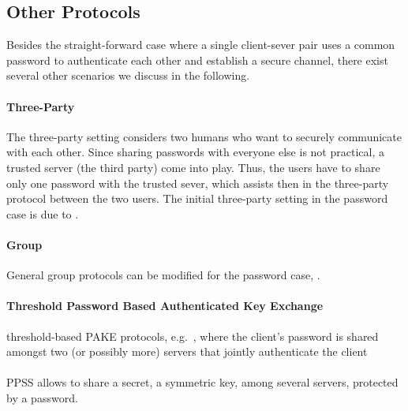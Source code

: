 
\subsection{Other  Protocols}
Besides the straight-forward case where a single client-sever pair uses a common password to authenticate each other and establish a secure channel, there exist several other scenarios we discuss in the following.

\paragraph{Three-Party }
The three-party setting considers two humans who want to securely communicate with each other.
Since sharing passwords with everyone else is not practical, a trusted server (the third party) come into play.
Thus, the users have to share only one password with the trusted sever, which assists then in the three-party protocol between the two users.
The initial three-party setting in the password case is due to \citeauthor{Abdalla2005} \cite{Abdalla2005}.

\paragraph{Group }
General group protocols can be modified for the password case, \eg \cite{Bresson02,BrChPo05}.

\paragraph{Threshold Password Based Authenticated Key Exchange}
threshold-based PAKE protocols, e.g.~\cite{Abdalla2005b}, where the client's password is shared amongst two (or possibly more) servers that jointly authenticate the client

\paragraph{}
\ac{PPSS} allows to share a secret, \eg a symmetric key, among several servers, protected by a password. \cite{Bagherzandi2011}

